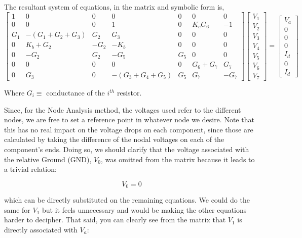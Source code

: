 The resultant system of equations, in the matrix and symbolic form is,\\
\begin{equation}
\label{eq:node}
\begin{bmatrix}
1 & 0 & 0 & 0 & 0 & 0 & 0 \\
0 & 0 & 0  & 1 & 0 & K_cG_6 & -1 \\
G_1 & -(G_1+G_2+G_3) & G_2 & G_3 & 0 & 0 & 0  \\
0 & K_b+G_2 & -G_2 & -K_b & 0 & 0 & 0 \\
0 & -G_2 & G_2 & -G_5 & G_5 & 0 & 0 \\
0 & 0 & 0 & 0 & 0 & G_6+G_7 & G_7 \\
0 & G_3 & 0 & -(G_3+G_4+G_5) & G_5 & G_7 & -G_7
\end{bmatrix}
\begin{bmatrix}
V_1 \\
V_2 \\
V_3 \\
V_4 \\
V_5 \\
V_6 \\
V_7 
\end{bmatrix}
=
\begin{bmatrix}
V_a \\
0 \\
0 \\
0 \\ 
I_d \\
0 \\
I_d 
\end{bmatrix}
\end{equation}

Where $G_i\equiv $ conductance of the $i^{th}$ resistor.

\vspace{0.75cm}

Since, for the Node Analysis method, the voltages used refer to the different nodes, we are free to set a reference point in whatever node we desire. Note that this has no real impact on the voltage drops on each component, since those are calculated by taking the difference of the nodal voltages on each of the component's ends. Doing so, we should clarify that the voltage associated with the relative Ground (GND), $V_0$, was omitted from the matrix because it leads to a trivial relation: 

\begin{equation}
  V_0 = 0  
\end{equation}

\noindent which can be directly substituted on the remaining equations. We could do the same for $V_1$ but it feels unnecessary and would be making the other equations harder to decipher. That said, you can clearly see from the matrix that $V_1$ is directly associated with $V_a$:


